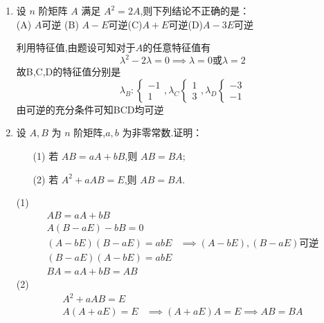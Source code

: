 \documentclass[12pt, a4paper, oneside, UTF8]{ctexbook}
\begin{document}
\begin{enumerate}[label=\arabic*.,start=4]
    \item 设 $ n $ 阶矩阵 $ A $ 满足 $ A^2 = 2A $,则下列结论不正确的是： \\
    (A) $A$可逆 \qquad (B) $A-E$可逆\qquad (C)$A+E$可逆\qquad (D)$A-3E$可逆 
    \begin{solution}
    利用特征值,由题设可知对于$A$的任意特征值有
    $$
        \lambda ^ 2 - 2\lambda = 0 \implies \lambda = 0 \text{或} \lambda = 2
    $$
    故B,C,D的特征值分别是  
    $$
        \lambda_B:\begin{cases}
            -1 \\
            1 
        \end{cases}, \lambda_C\begin{cases}
            1 \\
            3 
        \end{cases},\lambda_D\begin{cases}
            -3 \\
            -1
        \end{cases}
    $$
    由可逆的充分条件可知BCD均可逆
    \end{solution}
    
    \item 设 $ A, B $ 为 $ n $ 阶矩阵,$ a, b $ 为非零常数.证明：
    \begin{enumerate}
        \item[(1)] 若 $ AB = aA + bB $,则 $ AB = BA $;
        \item[(2)] 若 $ A^2 + aAB = E $,则 $ AB = BA $.
    \end{enumerate}
    
    \begin{solution}
    (1) 
    \begin{align*}
        AB = aA + bB& \\
        A(B-aE) - bB = 0& \\
        (A-bE)(B-aE)=abE &\implies (A-bE),(B-aE)\text{可逆} \\
        (B-aE)(A-bE)=abE& \\
        BA=aA+bB=AB&
    \end{align*}
    (2) 
    \begin{align*}
        A^2+aAB=E &\\
        A(A+aE)=E &\implies (A+aE)A = E \implies AB=BA
    \end{align*}
    \end{solution}
    

\end{enumerate}
\end{document}
